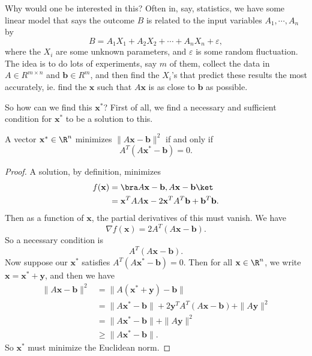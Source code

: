 \documentclass[a4paper]{article}
\begin{document}
Why would one be interested in this? Often in, say, statistics, we have some linear model that says the outcome $B$ is related to the input variables $A_1, \cdots, A_n$ by
\[
  B = A_1 X_1 + A_2 X_2 + \cdots + A_n X_n + \varepsilon,
\]
where the $X_i$ are some unknown parameters, and $\varepsilon$ is some random fluctuation. The idea is to do lots of experiments, say $m$ of them, collect the data in $A \in R^{m \times n}$ and $\mathbf{b} \in R^m$, and then find the $X_i$'s that predict these results the most accurately, ie. find the $\mathbf{x}$ such that $A\mathbf{x}$ is as close to $\mathbf{b}$ as possible.

So how can we find this $\mathbf{x}^*$? First of all, we find a necessary and sufficient condition for $\mathbf{x}^*$ to be a solution to this.
\begin{thm}
  A vector $\mathbf{x}^* \in \R^n$ minimizes $\|A\mathbf{x} - \mathbf{b}\|^2$ if and only if
  \[
    A^T(A\mathbf{x}^* - \mathbf{b}) = 0.
  \]
\end{thm}

\begin{proof}
  A solution, by definition, minimizes
  \begin{align*}
    f(\mathbf{x}) &= \bra A\mathbf{x} - \mathbf{b}, A\mathbf{x} - \mathbf{b}\ket\\
    &= \mathbf{x}^T AA\mathbf{x} - 2\mathbf{x}^T A^T \mathbf{b} + \mathbf{b}^T \mathbf{b}.
  \end{align*}
  Then as a function of $\mathbf{x}$, the partial derivatives of this must vanish. We have
  \[
    \nabla f(\mathbf{x}) = 2A^T(A\mathbf{x} - \mathbf{b}).
  \]
  So a necessary condition is
  \[
    A^T (A\mathbf{x} - \mathbf{b}).
  \]
  Now suppose our $\mathbf{x}^*$ satisfies $A^T (A\mathbf{x}^* - \mathbf{b}) = 0$. Then for all $\mathbf{x} \in \R^n$, we write $\mathbf{x} = \mathbf{x}^* + \mathbf{y}$, and then we have
  \begin{align*}
    \|A\mathbf{x} - \mathbf{b}\|^2 &= \|A(\mathbf{x}^* + \mathbf{y}) - \mathbf{b}\|\\
    &= \|A \mathbf{x}^* - \mathbf{b}\| + 2\mathbf{y}^T A^T (A\mathbf{x} - \mathbf{b}) + \|A\mathbf{y}\|^2\\
    &= \|A \mathbf{x}^* - \mathbf{b}\| + \|A\mathbf{y}\|^2\\
    &\geq \|A \mathbf{x}^* - \mathbf{b}\|.
  \end{align*}
  So $\mathbf{x}^*$ must minimize the Euclidean norm.
\end{proof}
\end{document}
